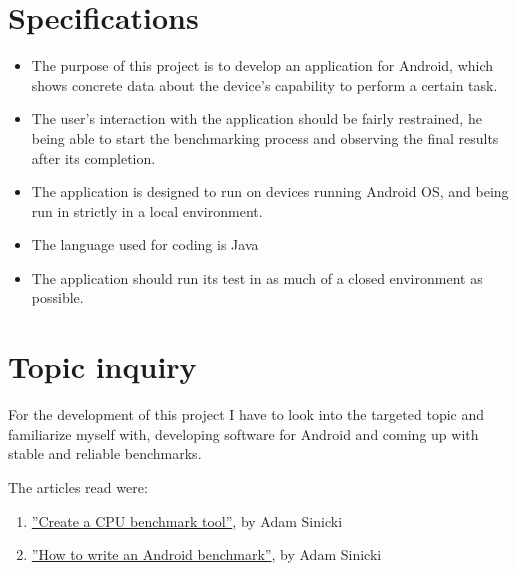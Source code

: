 \documentclass[a4paper,10pt]{report}
\begin{document}
\newpage
\section{Specifications}
 \begin{itemize}
 \item The purpose of this project is to develop an application for Android, which shows concrete data about the device's capability to perform a certain task.
 \item The user's interaction with the application should be fairly restrained, he being able to start the benchmarking process and observing the final results after its completion.
 \item The application is designed to run on devices running Android OS, and being run in strictly in a local environment.
 \item The language used for coding is Java
 \item The application should run its test in as much of a closed environment as possible. %
 \end{itemize}

\section{Topic inquiry}
 For the development of this project I have to look into the targeted topic and familiarize myself with, developing software for Android and coming up with stable and reliable benchmarks.

 The articles read were:
 \begin{enumerate}
 \item \href{https://www.androidauthority.com/write-an-android-cpu-benchmark-part-1-679929/}{''Create a CPU benchmark tool''}, by Adam Sinicki
 \item \href{https://www.androidauthority.com/write-an-android-cpu-benchmark-tool-part-2-681455/}{''How to write an Android benchmark''}, by Adam Sinicki
 \end{enumerate}
\end{document}
